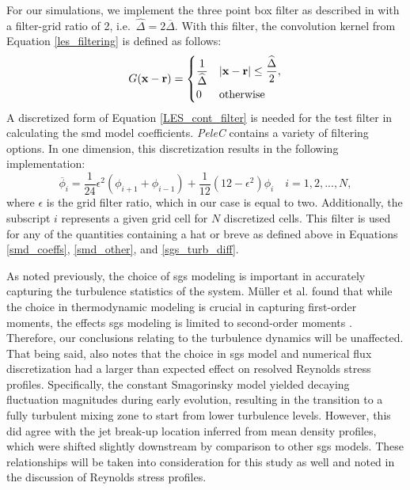 For our simulations, we implement the three point box filter as described in \cite{filter} with a filter-grid ratio of 2, i.e.\  $\widehat{\Delta}=2\overline{\Delta}$. With this filter, the convolution kernel from Equation \eqref{les_filtering} is defined as follows: 
\begin{equation} \label{LES_cont_filter}
G(\vb{x} - \vb{r}) = 
\begin{cases} 
      \dfrac{1}{\widehat{\Delta}} & |\vb{x} - \vb{r}|\leq \dfrac{\widehat{\Delta}}{2}, \vspace{2pt}\\ 
      0 & \text{otherwise}
   \end{cases}
\end{equation}
A discretized form of Equation \eqref{LES_cont_filter} is needed for the test filter in calculating the \gls{smd} model coefficients. \textit{PeleC} contains a variety of filtering options. In one dimension, this discretization results in the following implementation:
\begin{equation}
\overline{\phi}_i = \dfrac{1}{24}\epsilon^2\left(\phi_{i+1} + \phi_{i-1} \right) + \dfrac{1}{12}\left( 12 - \epsilon^2\right)\phi_i \quad i = 1,2,...,N,
\end{equation}
where $\epsilon$ is the grid filter ratio, which in our case is equal to two. Additionally, the subscript $i$ represents a given grid cell for $N$ discretized cells. This filter is used for any of the quantities containing a hat or breve as defined above in Equations \eqref{smd_coeffs}, \eqref{smd_other}, and \eqref{sgs_turb_diff}.

As noted previously, the choice of \gls{sgs} modeling is important in accurately capturing the turbulence statistics of the system. M\"{u}ller et al. found that while the choice in thermodynamic modeling is crucial in capturing first-order moments, the effects \gls{sgs} modeling is limited to second-order moments \cite{doi:10.1063/1.4937948}. Therefore, our conclusions relating to the turbulence dynamics will be unaffected. That being said, \cite{doi:10.1063/1.4937948} also notes that the choice in \gls{sgs} model and numerical flux discretization had a larger than expected effect on resolved Reynolds stress profiles. Specifically, the constant Smagorinsky model yielded decaying fluctuation magnitudes during early evolution, resulting in the transition to a fully turbulent mixing zone to start from lower turbulence levels. However, this did agree with the jet break-up location inferred from mean density profiles, which were shifted slightly downstream by comparison to other \gls{sgs} models. These relationships will be taken into consideration for this study as well and noted in the discussion of Reynolds stress profiles.


